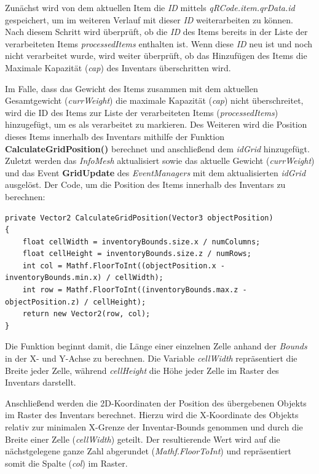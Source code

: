 Zunächst wird von dem aktuellen Item die \textit{ID} mittels \textit{qRCode.item.qrData.id} gespeichert, um im weiteren
Verlauf mit dieser \textit{ID} weiterarbeiten zu können. Nach diesem Schritt wird überprüft, ob die \textit{ID} des
Items bereits in der Liste der verarbeiteten Items \textit{processedItems} enthalten ist. Wenn diese \textit{ID} neu ist
und noch nicht verarbeitet wurde, wird weiter überprüft, ob das Hinzufügen des Items die Maximale Kapazität (\textit{cap})
des Inventars überschritten wird.

Im Falle, dass das Gewicht des Items zusammen mit dem aktuellen Gesamtgewicht (\textit{currWeight}) die maximale Kapazität
(\textit{cap}) nicht überschreitet, wird die ID des Items zur Liste der verarbeiteten Items (\textit{processedItems})
hinzugefügt, um es als verarbeitet zu markieren. Des Weiteren wird die Position dieses Items innerhalb des Inventars
mithilfe der Funktion \textbf{CalculateGridPosition()} berechnet und anschließend dem \textit{idGrid} hinzugefügt. Zuletzt
werden das \textit{InfoMesh} aktualisiert sowie das aktuelle Gewicht (\textit{currWeight}) und das Event \textbf{GridUpdate}
des \textit{EventManagers} mit dem aktualisierten \textit{idGrid} ausgelöst. Der Code, um die Position des Items
innerhalb des Inventars zu berechnen:
\begin{lstlisting}[caption={Position des Items berechnen}, label=code:controller_calcPos, language={[Sharp]C}]
private Vector2 CalculateGridPosition(Vector3 objectPosition)
{
    float cellWidth = inventoryBounds.size.x / numColumns;
    float cellHeight = inventoryBounds.size.z / numRows;
    int col = Mathf.FloorToInt((objectPosition.x - inventoryBounds.min.x) / cellWidth);
    int row = Mathf.FloorToInt((inventoryBounds.max.z - objectPosition.z) / cellHeight);
    return new Vector2(row, col);
}
\end{lstlisting}
Die Funktion beginnt damit, die Länge einer einzelnen Zelle anhand der \textit{Bounds} in der X- und Y-Achse zu berechnen.
Die Variable \textit{cellWidth} repräsentiert die Breite jeder Zelle, während \textit{cellHeight} die Höhe jeder Zelle
im Raster des Inventars darstellt.

Anschließend werden die 2D-Koordinaten der Position des übergebenen Objekts im Raster des Inventars berechnet. Hierzu
wird die X-Koordinate des Objekts relativ zur minimalen X-Grenze der Inventar-Bounds genommen und durch die Breite einer
Zelle (\textit{cellWidth}) geteilt. Der resultierende Wert wird auf die nächstgelegene ganze Zahl abgerundet (\textit{Mathf.FloorToInt})
und repräsentiert somit die Spalte (\textit{col}) im Raster.

